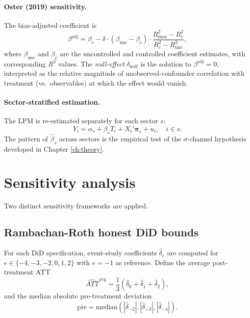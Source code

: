 \paragraph{Oster (2019) sensitivity.} The bias-adjusted coefficient is
\begin{equation}
\beta^{\text{adj}} = \beta_c - \delta \cdot (\beta_{\text{unc}} - \beta_c) \cdot \frac{R^2_{\max} - R^2_c}{R^2_c - R^2_{\text{unc}}},
\label{eq:methods_oster}
\end{equation}
where $\beta_{\text{unc}}$ and $\beta_c$ are the uncontrolled and controlled coefficient estimates, with corresponding $R^2$ values. The \emph{null-effect} $\delta_{\text{null}}$ is the solution to $\beta^{\text{adj}} = 0$, interpreted as the relative magnitude of unobserved-confounder correlation with treatment (vs.\ observables) at which the effect would vanish.

\paragraph{Sector-stratified estimation.} The LPM is re-estimated separately for each sector $s$:
\begin{equation}
Y_i = \alpha_s + \beta_s T_i + X_i'\boldsymbol{\pi}_s + u_i, \quad i \in s.
\label{eq:methods_sector_lpm}
\end{equation}
The pattern of $\hat{\beta}_s$ across sectors is the empirical test of the $\sigma$-channel hypothesis developed in Chapter \ref{ch:theory}.

\section{Sensitivity analysis}
\label{sec:methods_sensitivity}

Two distinct sensitivity frameworks are applied.

\subsection{Rambachan-Roth honest DiD bounds}

For each DiD specification, event-study coefficients $\hat{\delta}_e$ are computed for $e \in \{-4, -3, -2, 0, 1, 2\}$ with $e = -1$ as reference. Define the average post-treatment ATT
\begin{equation}
\widehat{ATT}^{\text{avg}} = \frac{1}{3}(\hat{\delta}_0 + \hat{\delta}_1 + \hat{\delta}_2),
\label{eq:methods_avg_att}
\end{equation}
and the median absolute pre-treatment deviation
\begin{equation}
\overline{\text{pre}} = \text{median}\left( |\hat{\delta}_{-2}|, |\hat{\delta}_{-3}|, |\hat{\delta}_{-4}| \right).
\label{eq:methods_median_pre}
\end{equation}

